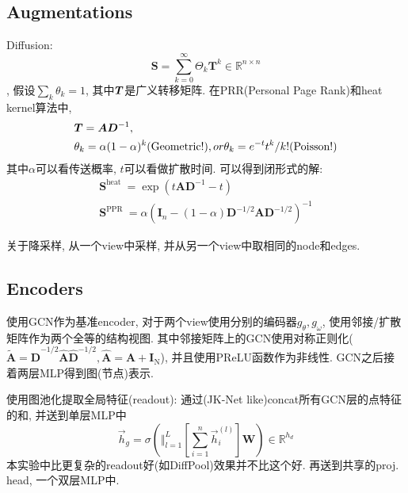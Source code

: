 \documentclass{article}
\begin{document}
\subsection{Augmentations}
\begin{flushleft}
Diffusion:
\begin{equation}
    \mathbf{S}=\sum_{k=0}^{\infty} \Theta_{k} \mathbf{T}^{k} \in \mathbb{R}^{n \times n}
\end{equation},
假设$\sum_k \theta_k =1$, 其中$\boldsymbol{T}$是广义转移矩阵.
在PRR(Personal Page Rank)和heat kernel算法中, 
\begin{align}
    &\boldsymbol{T} = \boldsymbol{A} \boldsymbol{D}^{-1}, \\
    &\theta_k=\alpha(1-\alpha)^k\text{(Geometric!)}, or \theta_k = e^{-t}t^k/k!\text{(Poisson!)}
\end{align}
其中$\alpha$可以看传送概率, $t$可以看做扩散时间. 可以得到闭形式的解:
\begin{equation}
    \begin{array}{c}
    \mathbf{S}^{\text {heat }}=\exp \left(t \mathbf{A} \mathbf{D}^{-1}-t\right) \\
    \mathbf{S}^{\text {PPR }}=\alpha\left(\mathbf{I}_{n}-(1-\alpha) \mathbf{D}^{-1 / 2} \mathbf{A} \mathbf{D}^{-1 / 2}\right)^{-1}
    \end{array}
\end{equation}

关于降采样, 从一个view中采样, 并从另一个view中取相同的node和edges.
\end{flushleft}

\subsection{Encoders}
\begin{flushleft}
使用GCN作为基准encoder, 对于两个view使用分别的编码器$g_\theta, g_\omega$, 使用邻接/扩散矩阵作为两个全等的结构视图. 其中邻接矩阵上的GCN使用对称正则化($\tilde{\mathbf{A}}=\hat{\mathbf{D}}^{-1 / 2} \hat{\mathbf{A}} \hat{\mathbf{D}}^{-1 / 2},\hat{\mathbf{A}}=\mathbf{A}+\mathbf{I}_{\mathrm{N}}$), 并且使用PReLU函数作为非线性. GCN之后接着两层MLP得到图(节点)表示.

使用图池化提取全局特征(readout): 通过(JK-Net like)concat所有GCN层的点特征的和, 并送到单层MLP中
\begin{equation}
    \vec{h}_{g}=\sigma\left(\Vert_{l=1}^{L}\left[\sum_{i=1}^{n} \vec{h}_{i}^{(l)}\right] \mathbf{W}\right) \in \mathbb{R}^{h_{d}}
\end{equation}
本实验中比更复杂的readout好(如DiffPool)效果并不比这个好. 再送到共享的proj. head, 一个双层MLP中.

\end{flushleft}
\end{document}
